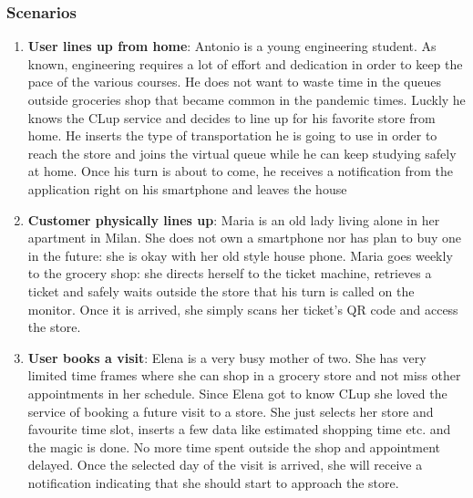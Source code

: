 \documentclass[]{article}
\begin{document}
	
		\subsubsection{Scenarios}
	
					\begin{enumerate}
						
					\item \textbf{User lines up from home}: \newline
								Antonio is a young engineering student. As known, engineering requires a lot of effort and dedication in order to keep the pace of the various courses. He does not want to waste time in the queues outside groceries shop that became common in the pandemic times. Luckly he knows the CLup service and decides to line up for his favorite store from home. \newline He inserts the type of transportation he is going to use in order to reach the store and joins the virtual queue while he can keep studying safely at home. Once his turn is about to come, he receives a notification from the application right on his smartphone and leaves the house \newline
						
					\item \textbf{Customer physically lines up}: \newline
						Maria is an old lady living alone in her apartment in Milan. She does not own a smartphone nor has plan to buy one in the future: she is okay with her old style house phone. \newline Maria goes weekly to the grocery shop: she directs herself to the ticket machine, retrieves a ticket and safely waits outside the store that his turn is called on the monitor. Once it is arrived, she simply scans her ticket's QR code and access the store. \newline
						
						
					\item \textbf{User books a visit}: \newline
						Elena is a very busy mother of two. She has very limited time frames where she can shop in a grocery store and not miss other appointments in her schedule. \newline
		Since Elena got to know CLup she loved the service of booking a future visit to a store. She just selects her store and favourite time slot, inserts a few data like estimated shopping time etc. and the magic is done. No more time spent outside the shop and appointment delayed.\newline
		Once the selected day of the visit is arrived, she will receive a notification indicating that she should start to approach the store. \newline
		

\end{enumerate}
\end{document}
